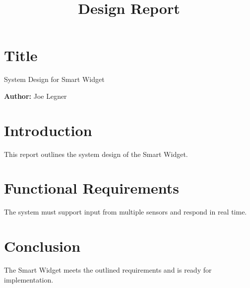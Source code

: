 \documentclass{article}
\title{Design Report}
\begin{document}
\maketitle

\section*{Title}
System Design for Smart Widget

\textbf{Author:} Joe Legner\\

\section{Introduction}
This report outlines the system design of the Smart Widget.

\section{Functional Requirements}
The system must support input from multiple sensors and respond in real time.

\section{Conclusion}
The Smart Widget meets the outlined requirements and is ready for implementation.
\end{document}
